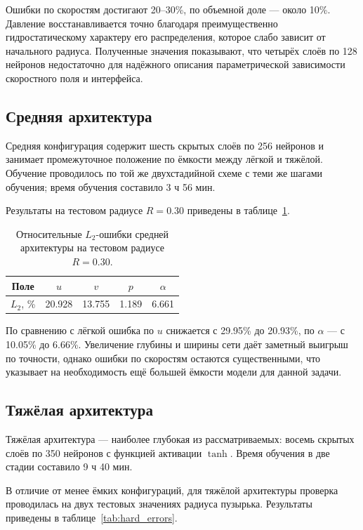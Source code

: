 Ошибки по скоростям достигают 20--30\%, по объемной доле --- около 10\%.
Давление восстанавливается точно благодаря преимущественно гидростатическому
характеру его распределения, которое слабо зависит от начального радиуса.
Полученные значения показывают, что четырёх слоёв по 128 нейронов недостаточно
для надёжного описания параметрической зависимости скоростного поля и
интерфейса.

\subsection{Средняя архитектура}

Средняя конфигурация содержит шесть скрытых слоёв по 256 нейронов и занимает
промежуточное положение по ёмкости между лёгкой и тяжёлой. Обучение проводилось
по той же двухстадийной схеме с теми же шагами обучения; время обучения
составило 3 ч 56 мин.

Результаты на тестовом радиусе \(R=0.30\) приведены в
таблице~\ref{tab:medium_errors}.

\begin{table}[H]
    \centering
    \caption{Относительные \(L_2\)-ошибки средней архитектуры на тестовом радиусе \(R=0.30\).}
    \label{tab:medium_errors}
    \begin{tabular}{c|cccc}
        \hline
        Поле & \(u\) & \(v\) & \(p\) & \(\alpha\) \\
        \hline
        \(L_2\), \% & 20.928 & 13.755 & 1.189 & 6.661 \\
        \hline
    \end{tabular}
\end{table}

По сравнению с лёгкой ошибка по \(u\) снижается с 29.95\% до 20.93\%, по
\(\alpha\) --- с 10.05\% до 6.66\%. Увеличение глубины и ширины сети даёт
заметный выигрыш по точности, однако ошибки по скоростям остаются
существенными, что указывает на необходимость ещё большей ёмкости модели
для данной задачи.

\subsection{Тяжёлая архитектура}

Тяжёлая архитектура --- наиболее глубокая из рассматриваемых: восемь скрытых
слоёв по 350 нейронов с функцией активации \(\tanh\). Время обучения в две
стадии составило 9 ч 40 мин.

В отличие от менее ёмких конфигураций, для тяжёлой архитектуры проверка
проводилась на двух тестовых значениях радиуса пузырька. Результаты приведены в
таблице~\ref{tab:hard_errors}.

